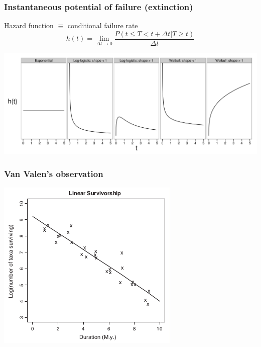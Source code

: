 \documentclass{beamer}
\begin{document}
\begin{frame}
  \frametitle{Instantaneous potential of failure (extinction)}

  \begin{block}{Hazard function \(\equiv\) conditional failure rate}
    \[
      h(t) = \lim_{\Delta t \to 0} \frac{P(t \leq T < t + \Delta t | T \geq t)}{\Delta t}
    \]
  \end{block}

  \begin{center}
    \includegraphics[height = 0.5\textheight, width = \textwidth, keepaspectratio = true]{figure/hazard}
  \end{center}
\end{frame}

\begin{frame}
  \frametitle{Van Valen's observation}

  \begin{center}
    \includegraphics[height = 0.7\textheight, keepaspectratio = true]{figure/liow}

    \tiny{}
  \end{center}
\end{frame}
\end{document}
